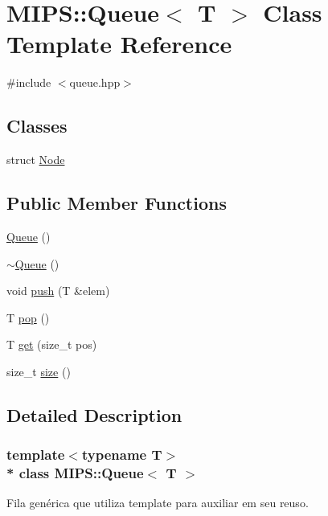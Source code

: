 \hypertarget{classMIPS_1_1Queue}{}\section{M\+I\+PS\+:\+:Queue$<$ T $>$ Class Template Reference}
\label{classMIPS_1_1Queue}


{\ttfamily \#include $<$queue.\+hpp$>$}

\subsection*{Classes}
\begin{DoxyCompactItemize}
\item 
struct \hyperlink{structMIPS_1_1Queue_1_1Node}{Node}
\end{DoxyCompactItemize}
\subsection*{Public Member Functions}
\begin{DoxyCompactItemize}
\item 
\hyperlink{classMIPS_1_1Queue_a9e0601a711a1cca386a294b307016d87}{Queue} ()
\item 
\hyperlink{classMIPS_1_1Queue_aec877c1c927ec1fae8b7a1db1b8a3eb5}{$\sim$\+Queue} ()
\item 
void \hyperlink{classMIPS_1_1Queue_a77b7b0d1c09253d3efc665f75f3dee45}{push} (T \&elem)
\item 
T \hyperlink{classMIPS_1_1Queue_a6a1fb36a33fe4ded5eb8e6c4dd754c54}{pop} ()
\item 
T \hyperlink{classMIPS_1_1Queue_adeb864dfe03bceff01a57270337987ad}{get} (size\+\_\+t pos)
\item 
size\+\_\+t \hyperlink{classMIPS_1_1Queue_a894681d26fc3e3bf2665a1b81cc18341}{size} ()
\end{DoxyCompactItemize}


\subsection{Detailed Description}
\subsubsection*{template$<$typename T$>$\\*
class M\+I\+P\+S\+::\+Queue$<$ T $>$}

Fila genérica que utiliza template para auxiliar em seu reuso.


